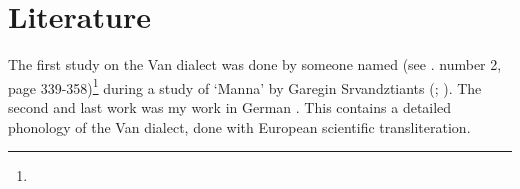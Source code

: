 \begin{table}[H]
	\centering
	\caption{Participles or converbs <> for the verb `to want' in the Vozim subdialect of the Van dialect}
	\label{tab:Van:subdialect:Vozim:morpho:verb:paradigm:participle}
\end{table}

\begin{adjarianpage}\label{page:150}\end{adjarianpage}%

\section{Literature}

The first study on the Van dialect was done by someone named  (see . number 2, page 339-358)\footnote{} during a study of `Manna' \citep{manana} by Garegin Srvandztiants (; ). The second and last work was my work in German \citep{adjarian-1901-lautlehreVan}. This contains a detailed phonology of the Van dialect, done with European scientific transliteration. 

